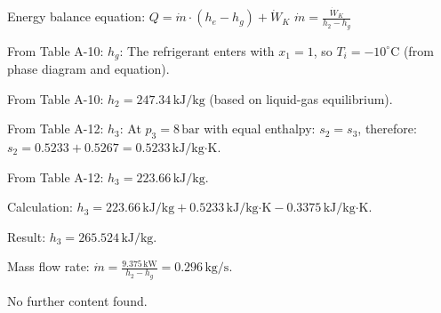 Energy balance equation:  
\( Q = \dot{m} \cdot (h_e - h_g) + \dot{W}_K \)  
\( \dot{m} = \frac{\dot{W}_K}{h_2 - h_g} \)  

From Table A-10:  
\( h_g \):  
The refrigerant enters with \( x_1 = 1 \), so \( T_i = -10^\circ \text{C} \) (from phase diagram and equation).  

From Table A-10:  
\( h_2 = 247.34 \, \text{kJ/kg} \) (based on liquid-gas equilibrium).  

From Table A-12:  
\( h_3 \):  
At \( p_3 = 8 \, \text{bar} \) with equal enthalpy:  
\( s_2 = s_3 \), therefore:  
\( s_2 = 0.5233 + 0.5267 = 0.5233 \, \text{kJ/kg·K} \).  

From Table A-12:  
\( h_3 = 223.66 \, \text{kJ/kg} \).  

Calculation:  
\( h_3 = 223.66 \, \text{kJ/kg} + 0.5233 \, \text{kJ/kg·K} - 0.3375 \, \text{kJ/kg·K} \).  

Result:  
\( h_3 = 265.524 \, \text{kJ/kg} \).  

Mass flow rate:  
\( \dot{m} = \frac{9.375 \, \text{kW}}{h_2 - h_g} = 0.296 \, \text{kg/s} \).  

No further content found.